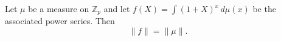 Let $\mu$ be a measure on $\mathbb{Z}_p$ and let $f(X) = \int (1+X)^x \, d\mu(x)$ be the associated power series. Then
$$
\|f\| = \|\mu\|.
$$
